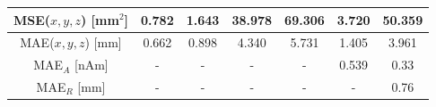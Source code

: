 \documentclass[aspectratio=169, 9pt]{beamer}
\begin{document}
\begin{table}[]
\begin{tabular}{c|cccccc|}
\multicolumn{1}{|c|}{\cellcolor[HTML]{EFEFEF}MSE($x, y, z$) {[}mm$^2${]}}                                           & \multicolumn{1}{c|}{0.782}                                                                                & \multicolumn{1}{c|}{1.643}                                                                                 & \multicolumn{1}{c|}{38.978}                                                                              & \multicolumn{1}{c|}{69.306}                                                                             & \multicolumn{1}{c|}{3.720}                                                                                            & 50.359                                                                                       \\ \hline
\multicolumn{1}{|c|}{\cellcolor[HTML]{EFEFEF}MAE($x, y, z$) {[}mm{]}}                                               & \multicolumn{1}{c|}{0.662}                                                                                & \multicolumn{1}{c|}{0.898}                                                                                 & \multicolumn{1}{c|}{4.340}                                                                               & \multicolumn{1}{c|}{5.731}                                                                              & \multicolumn{1}{c|}{1.405}                                                                                            & 3.961                                                                                        \\ \hline
\multicolumn{1}{|c|}{\cellcolor[HTML]{EFEFEF}MAE$_A$ {[}nAm{]}}                                                 & \multicolumn{1}{c|}{-}                                                                                    & \multicolumn{1}{c|}{-}                                                                                     & \multicolumn{1}{c|}{-}                                                                                   & \multicolumn{1}{c|}{-}                                                                                  & \multicolumn{1}{c|}{0.539}                                                                                            & 0.33                                                                                         \\ \hline
\multicolumn{1}{|c|}{\cellcolor[HTML]{EFEFEF}MAE$_R$ {[}mm{]}}                                                      & \multicolumn{1}{c|}{-}                                                                                    & \multicolumn{1}{c|}{-}                                                                                     & \multicolumn{1}{c|}{-}                                                                                   & \multicolumn{1}{c|}{-}                                                                                  & \multicolumn{1}{c|}{-}                                                                                                & 0.76                                                                                         \\ \hline

\end{tabular}
\end{table}
\end{document}
